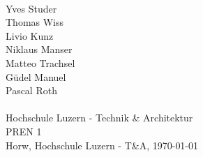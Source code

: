 \begin{titlepage}
    \begin{center}     
        \\
        \vspace*{1.2cm}
        Yves Studer\\
        Thomas Wiss\\
        Livio Kunz\\
        Niklaus Manser\\
        Matteo Trachsel\\
        Güdel Manuel\\
        Pascal Roth\\
        \vspace*{1.2cm}
        {\Huge \myTitel}\\
        \vspace*{1cm}
        \vspace*{10cm}
        {\normalsize Hochschule Luzern - Technik \& Architektur}\\
        {\normalsize PREN 1}\\
        \vspace*{0.6cm}
        {\normalsize Horw, Hochschule Luzern - T\&A, \today}\\
    \end{center}
\end{titlepage}
